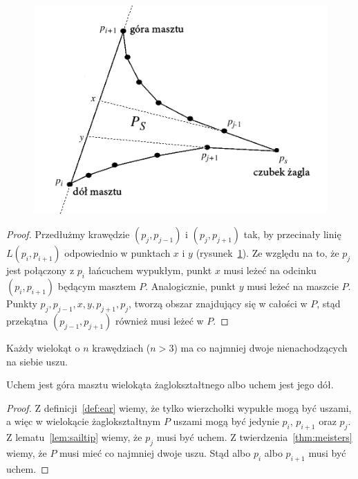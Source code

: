 \begin{figure}[htb]
  \centering
  \includegraphics[scale=0.7]{img/toussaint3}
  \caption{\label{img:toussaint3}}
\end{figure}

\begin{proof}
  Przedłużmy krawędzie $(p_j,p_{j-1})$ i $(p_j, p_{j+1})$ tak, by
  przecinały linię $L(p_i, p_{i+1})$ odpowiednio w punktach $x$ i $y$
  (rysunek~\ref{img:toussaint3}). Ze względu na to, że $p_j$ jest
  połączony z $p_i$ łańcuchem wypukłym, punkt $x$ musi leżeć na
  odcinku $(p_i, p_{i+1})$ będącym masztem $P$. Analogicznie, punkt
  $y$ musi leżeć na maszcie $P$. Punkty $p_j, p_{j-1}, x, y, p_{j+1},
  p_j$, tworzą obszar znajdujący się w całości w $P$, stąd przekątna
  $(p_{j-1}, p_{j+1})$ również musi leżeć w $P$.
\end{proof}

\begin{twierdzenie} Każdy wielokąt o
  $n$ krawędziach ($n > 3$) ma co najmniej dwoje nienachodzących na
  siebie uszu.
\end{twierdzenie}

\begin{lemat}\label{lem:sailmast}
  Uchem jest góra masztu wielokąta żaglokształtnego albo uchem jest
  jego dół.
\end{lemat}

\begin{proof}
  Z definicji~\ref{def:ear} wiemy, że tylko wierzchołki wypukłe mogą
  być uszami, a więc w wielokącie żaglokształtnym $P$ uszami mogą być
  jedynie $p_i$, $p_{i+1}$ oraz $p_j$. Z lematu~\ref{lem:sailtip}
  wiemy, że $p_j$ musi być uchem. Z twierdzenia~\ref{thm:meisters}
  wiemy, że $P$ musi mieć co najmniej dwoje uszu. Stąd albo $p_i$ albo
  $p_{i+1}$ musi być uchem.
\end{proof}

